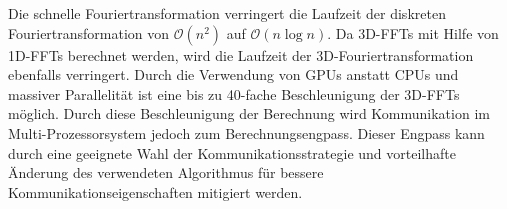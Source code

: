 Die schnelle Fouriertransformation verringert die Laufzeit der diskreten Fouriertransformation von $\mathcal O(n^2)$ auf $\mathcal O(n \log n)$. Da 3D-FFTs mit Hilfe von 1D-FFTs berechnet werden, wird die Laufzeit der  3D-Fouriertransformation ebenfalls verringert. 
\newline
Durch die Verwendung von GPUs anstatt CPUs und massiver Parallelität ist eine bis zu 40-fache Beschleunigung der 3D-FFTs möglich. Durch diese Beschleunigung der Berechnung wird Kommunikation im Multi-Prozessorsystem jedoch zum Berechnungsengpass. Dieser Engpass kann durch eine geeignete Wahl der Kommunikationsstrategie und vorteilhafte Änderung des verwendeten Algorithmus für bessere Kommunikationseigenschaften mitigiert werden.

